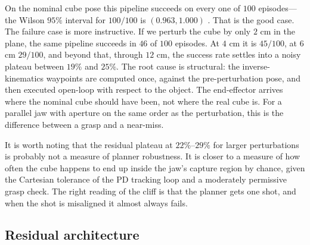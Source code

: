 \documentclass[letterpaper, 11 pt, journal, twoside]{IEEEtran}
\begin{document}
On the nominal cube pose this pipeline succeeds on every one of $100$ episodes---the Wilson $95\%$ interval for $100/100$ is $(0.963, 1.000)$ \cite{Brown2001Wilson}. That is the good case. The failure case is more instructive. If we perturb the cube by only $2$ cm in the plane, the same pipeline succeeds in $46$ of $100$ episodes. At $4$ cm it is $45/100$, at $6$ cm $29/100$, and beyond that, through $12$ cm, the success rate settles into a noisy plateau between $19\%$ and $25\%$. The root cause is structural: the inverse-kinematics waypoints are computed once, against the pre-perturbation pose, and then executed open-loop with respect to the object. The end-effector arrives where the nominal cube should have been, not where the real cube is. For a parallel jaw with aperture on the same order as the perturbation, this is the difference between a grasp and a near-miss.

It is worth noting that the residual plateau at $22\%$--$29\%$ for larger perturbations is probably not a measure of planner robustness. It is closer to a measure of how often the cube happens to end up inside the jaw's capture region by chance, given the Cartesian tolerance of the PD tracking loop and a moderately permissive grasp check. The right reading of the cliff is that the planner gets one shot, and when the shot is misaligned it almost always fails.

\subsection{Residual architecture}
\label{sec:residual}
\end{document}
